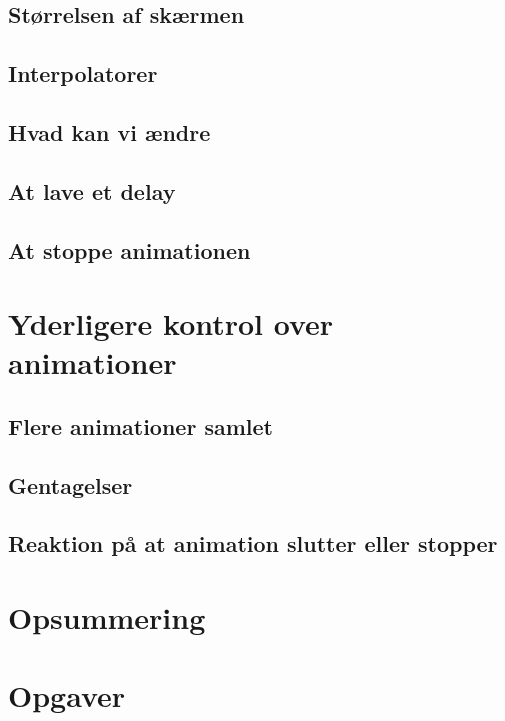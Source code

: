 \subsection{Størrelsen af skærmen}
\subsection{Interpolatorer}
\subsection{Hvad kan vi ændre}
\subsection{At lave et delay}
\subsection{At stoppe animationen}
\section{Yderligere kontrol over animationer}
\subsection{Flere animationer samlet}
\subsection{Gentagelser}
\subsection{Reaktion på at animation slutter eller stopper}
\section{Opsummering}
\section{Opgaver}